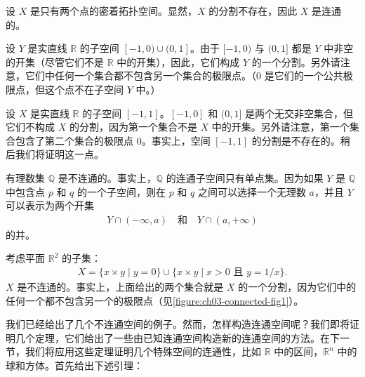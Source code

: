 \documentclass[../../main.tex]{subfiles}
\begin{document}
\begin{example}\label{example:ch03-two-point-indiscrete}
设 $X$ 是只有两个点的密着拓扑空间。显然，$X$ 的分割不存在，因此 $X$ 是连通的。
\end{example}

\begin{example}\label{example:ch03-minus-two-points}
设 $Y$ 是实直线 $\mathbb{R}$ 的子空间 $[-1,0)\cup(0,1]$。由于 $[-1,0)$ 与 $(0,1]$ 都是 $Y$ 中非空的开集（尽管它们不是 $\mathbb{R}$ 中的开集），因此，它们构成 $Y$ 的一个分割。另外请注意，它们中任何一个集合都不包含另一个集合的极限点。（$0$ 是它们的一个公共极限点，但这个点不在子空间 $Y$ 中。）
\end{example}

\begin{example}\label{example:ch03-closed-interval}
设 $X$ 是实直线 $\mathbb{R}$ 的子空间 $[-1,1]$。$[-1,0]$ 和 $(0,1]$ 是两个无交非空集合，但它们不构成 $X$ 的分割，因为第一个集合不是 $X$ 中的开集。另外请注意，第一个集合包含了第二个集合的极限点 $0$。事实上，空间 $[-1,1]$ 的分割是不存在的。稍后我们将证明这一点。
\end{example}

\begin{example}\label{example:ch03-rationals}
有理数集 $\mathbb{Q}$ 是不连通的。事实上，$\mathbb{Q}$ 的连通子空间只有单点集。因为如果 $Y$ 是 $\mathbb{Q}$ 中包含点 $p$ 和 $q$ 的一个子空间，则在 $p$ 和 $q$ 之间可以选择一个无理数 $a$，并且 $Y$ 可以表示为两个开集
\begin{align*}
Y\cap(-\infty,a)\quad\text{和}\quad Y\cap(a,+\infty)
\end{align*}
的并。
\end{example}

\begin{example}\label{example:ch03-graph-asymptote}
考虑平面 $\mathbb{R}^{2}$ 的子集：
\begin{align*}
X=\{x\times y\mid y=0\}\cup\{x\times y\mid x>0\text{ 且 }y=1/x\}.
\end{align*}
$X$ 是不连通的。事实上，上面给出的两个集合就是 $X$ 的一个分割，因为它们中的任何一个都不包含另一个的极限点（见\cref{figure:ch03-connected-fig1}）。
\end{example}

我们已经给出了几个不连通空间的例子。然而，怎样构造连通空间呢？我们即将证明几个定理，它们给出了一些由已知连通空间构造新的连通空间的方法。在下一节，我们将应用这些定理证明几个特殊空间的连通性，比如 $\mathbb{R}$ 中的区间，$\mathbb{R}^{n}$ 中的球和方体。首先给出下述引理：
\end{document}
